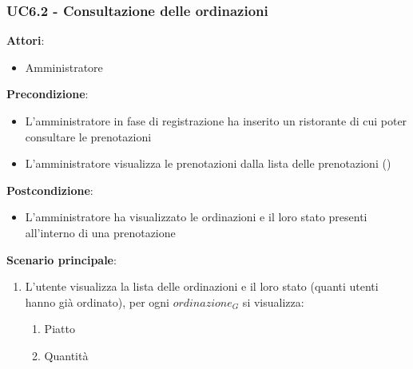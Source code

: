 \subsubsection{UC6.2 - Consultazione delle ordinazioni}\label{usecase:6_2}
\textbf{Attori}:
\begin{itemize}
    \item Amministratore
\end{itemize}
\textbf{Precondizione}:
\begin{itemize}
    \item L'amministratore in fase di registrazione ha inserito un ristorante di cui poter consultare le prenotazioni
    \item L'amministratore visualizza le prenotazioni dalla lista delle prenotazioni ()
\end{itemize}
\textbf{Postcondizione}:
\begin{itemize}
    \item L'amministratore ha visualizzato le ordinazioni e il loro stato presenti all'interno di una prenotazione
\end{itemize}
\textbf{Scenario principale}:
\begin{enumerate}
    \item L'utente visualizza la lista delle ordinazioni e il loro stato (quanti utenti hanno già ordinato), per ogni $\textit{ordinazione}_G$ si visualizza:
    \begin{enumerate}
        \item Piatto
        \item Quantità
    \end{enumerate}
\end{enumerate}
\newpage